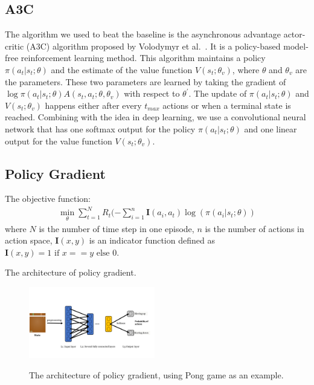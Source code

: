 \subsection{A3C}
The algorithm we used to beat the baseline is the asynchronous advantage actor-critic (A3C) algorithm proposed by Volodymyr et al.~\cite{mnih2016asynchronous}. It is a policy-based model-free reinforcement learning method. This algorithm maintains a policy $\pi (a_{t}|s_{t};\theta)$ and the estimate of the value function $V(s_{t};\theta_{v})$, where $\theta$ and $\theta_{v}$ are the parameters. These two parameters are learned by taking the gradient of $\log \pi (a_{t}|s_{t};\theta) A(s_{t},a_{t};\theta,\theta_{v})$ with respect to $\theta^{\prime}$. The update of $\pi (a_{t}|s_{t};\theta)$ and $V(s_{t};\theta_{v})$ happens either after every $t_{max}$ actions or when a terminal state is reached. Combining with the idea in deep learning, we use a convolutional neural network that has one softmax output for the policy $\pi (a_{t}|s_{t};\theta)$ and one linear output for the value function $V(s_{t};\theta_{v})$.


\subsection{Policy Gradient}
The objective function:
\begin{equation*}
\begin{split}
\min_{\theta}\sum_{t=1}^N R_t (-\sum_{i=1}^{n}\textbf{I}(a_i, a_t)\log(\pi(a_i|s_t; \theta))
\end{split}
\end{equation*}
where $N$ is the number of time step in one episode, $n$ is the number of actions
in action space, $\textbf{I}(x, y)$ is an indicator function defined as $\textbf{I}(x, y) = 1 \text{ if } x==y \text{ else } 0$.

The architecture of policy gradient. 

\begin{figure}[h!]
\label{fig:pg_picture}
\centering
\includegraphics[width=0.49\textwidth]{./fig/policygradient.pdf} \\
\caption{The architecture of policy gradient, using Pong game as an example.}
\end{figure}


